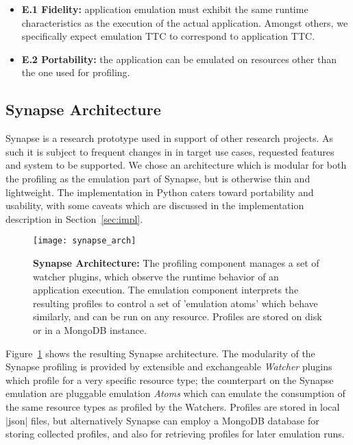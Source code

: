 \documentclass[10pt, conference, compsocconf]{IEEEtran}
\newcommand{\B}[1]{\textbf{#1}\xspace}
\newcommand{\I}[1]{\textit{#1}\xspace}
\newcommand{\synapse}{Synapse\xspace}
\newcommand{\Synapse}{Synapse\xspace}
\newenvironment{shortlist}{
  \begin{itemize}
}{
  \end{itemize}
}
\begin{document}
  \begin{shortlist}

    \item \B{E.1 Fidelity:} application emulation must exhibit the
        same runtime characteristics as the execution of the actual
        application.  Amongst others, we specifically expect emulation
        TTC to correspond to application TTC. 

    \item \B{E.2 Portability:} the application can be emulated on
        resources other than the one used for profiling.

  \end{shortlist}




 \subsection{Synapse Architecture}

 \Synapse is a research prototype used in support of other research
 projects.  As such it is subject to frequent changes in in target use cases,
 requested features and system to be supported.  We chose an architecture which
 is modular for both the profiling as the emulation part of Synapse, but is
 otherwise thin and lightweight.  The implementation in Python caters toward
 portability and usability, with some caveats which are discussed in the
 implementation description in Section~\ref{sec:impl}.

  \begin{figure}[h]
   \texttt{[image: synapse\_arch]}
   \caption{\textbf{\Synapse Architecture:} The profiling component
       manages a set of watcher plugins, which observe the runtime
       behavior of an application execution.  The emulation component
       interprets the resulting profiles to control a set of
       'emulation atoms' which behave similarly, and can be run on any
       resource.  Profiles are stored on disk or in a MongoDB
       instance.
     \label{fig:arch}
   }
  \end{figure}

  Figure~\ref{fig:arch} shows the resulting \synapse architecture.
  The modularity of the \synapse profiling is provided by extensible
  and exchangeable \I{Watcher} plugins which profile for a very
  specific resource type; the counterpart on the \synapse emulation
  are pluggable emulation \I{Atoms} which can emulate the consumption
  of the same resource types as profiled by the Watchers.  Profiles
  are stored in local |json| files, but alternatively \synapse can
  employ a MongoDB database for storing collected profiles, and also
  for retrieving profiles for later emulation runs.  
\end{document}
